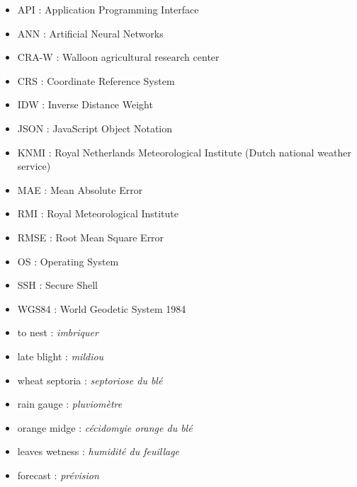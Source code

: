 \documentclass[12pt,twoside]{reedthesis}
\theoremstyle{definition}
\theoremstyle{definition}
\theoremstyle{definition}
\theoremstyle{remark}
\begin{document}
  \begin{abbreviations}
    \begin{itemize}
    \item
      API : Application Programming Interface
    \item
      ANN : Artificial Neural Networks
    \item
      CRA-W : Walloon agricultural research center
    \item
      CRS : Coordinate Reference System
    \item
      IDW : Inverse Distance Weight
    \item
      JSON : JavaScript Object Notation
    \item
      KNMI : Royal Netherlands Meteorological Institute (Dutch national
      weather service)
    \item
      MAE : Mean Absolute Error
    \item
      RMI : Royal Meteorological Institute
    \item
      RMSE : Root Mean Square Error
    \item
      OS : Operating System
    \item
      SSH : Secure Shell
    \item
      WGS84 : World Geodetic System 1984
    \end{itemize}
  \end{abbreviations}
  \begin{definitions}
    \begin{itemize}
    \item
      to nest : \emph{imbriquer}
    \item
      late blight : \emph{mildiou}
    \item
      wheat septoria : \emph{septoriose du blé}
    \item
      rain gauge : \emph{pluviomètre}
    \item
      orange midge : \emph{cécidomyie orange du blé}
    \item
      leaves wetness : \emph{humidité du feuillage}
    \item
      forecast : \emph{prévision}
    \end{itemize}
  \end{definitions}
  \printindex

  \listoffigures

  \listoftables

  \hypersetup{linkcolor=black}
  \setcounter{tocdepth}{2}
  \tableofcontents
\end{document}
